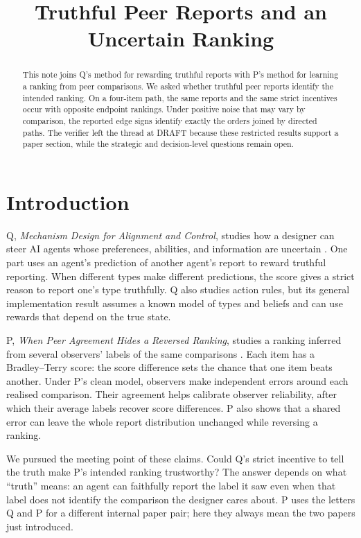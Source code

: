 \documentclass{article}
\title{Truthful Peer Reports and an Uncertain Ranking}
\begin{document}
\maketitle

\begin{abstract}
This note joins Q's method for rewarding truthful reports with P's method for learning a ranking from peer
comparisons. We asked whether truthful peer reports identify the intended ranking. On a four-item path, the
same reports and the same strict incentives occur with opposite endpoint rankings. Under positive noise that
may vary by comparison, the reported edge signs identify exactly the orders joined by directed paths. The
verifier left the thread at DRAFT because these restricted results support a paper section, while the
strategic and decision-level questions remain open.
\end{abstract}

\section{Introduction}

Q, \emph{Mechanism Design for Alignment and Control}, studies how a designer can steer AI agents whose
preferences, abilities, and information are uncertain \cite{Q}. One part uses an agent's prediction of another
agent's report to reward truthful reporting. When different types make different predictions, the score gives
a strict reason to report one's type truthfully. Q also studies action rules, but its general implementation
result assumes a known model of types and beliefs and can use rewards that depend on the true state.

P, \emph{When Peer Agreement Hides a Reversed Ranking}, studies a ranking inferred from several observers'
labels of the same comparisons \cite{P}. Each item has a Bradley--Terry score: the score difference sets the
chance that one item beats another. Under P's clean model, observers make independent errors around each
realised comparison. Their agreement helps calibrate observer reliability, after which their average labels
recover score differences. P also shows that a shared error can leave the whole report distribution unchanged
while reversing a ranking.

We pursued the meeting point of these claims. Could Q's strict incentive to tell the truth make P's intended
ranking trustworthy? The answer depends on what ``truth'' means: an agent can faithfully report the label it
saw even when that label does not identify the comparison the designer cares about. P uses the letters Q and P
for a different internal paper pair; here they always mean the two papers just introduced.
\end{document}
